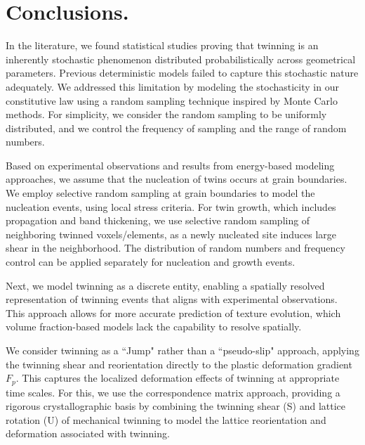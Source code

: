 \section{Conclusions.}
In the literature, we found statistical studies proving that twinning is an inherently stochastic phenomenon distributed probabilistically across geometrical parameters. Previous deterministic models failed to capture this stochastic nature adequately. We addressed this limitation by modeling the stochasticity in our constitutive law using a random sampling technique inspired by Monte Carlo methods.  For simplicity, we consider the random sampling to be uniformly distributed, and we control the frequency of sampling and the range of random numbers.

\vspace{0.2cm}

Based on experimental observations and results from energy-based modeling approaches, we assume that the nucleation of twins occurs at grain boundaries. We employ selective random sampling at grain boundaries to model the nucleation events, using local stress criteria. For twin growth, which includes propagation and band thickening, we use selective random sampling of neighboring twinned voxels/elements, as a newly nucleated site induces large shear in the neighborhood. The distribution of random numbers and frequency control can be applied separately for nucleation and growth events.

\vspace{0.2cm}

Next, we model twinning as a discrete entity, enabling a spatially resolved representation of twinning events that aligns with experimental observations. This approach allows for more accurate prediction of texture evolution, which volume fraction-based models lack the capability to resolve spatially.

\vspace{0.2cm}

We consider twinning as a ``Jump" rather than a ``pseudo-slip" approach, applying the twinning shear and reorientation directly to the plastic deformation gradient $F_p$. This captures the localized deformation effects of twinning at appropriate time scales. For this, we use the correspondence matrix approach, providing a rigorous crystallographic basis by combining the twinning shear (S) and lattice rotation (U) of mechanical twinning to model the lattice reorientation and deformation associated with twinning.

